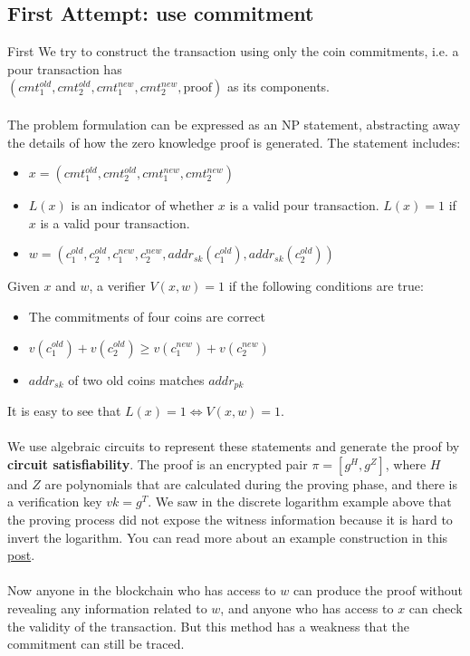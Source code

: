 \subsection{First Attempt: use commitment}
First We try to construct the transaction using only the coin commitments, i.e. a pour transaction has \\
$(cmt_1^{old} , cmt_2^{old}, cmt_1^{new}, cmt_2^{new} , \text{proof})$ as its components.\\\\
The problem formulation can be expressed as an NP statement, abstracting away the details of how the zero knowledge proof is generated. The statement includes:
\begin{itemize}
	\item $ x = (cmt_1^{old} , cmt_2^{old}, cmt_1^{new}, cmt_2^{new}) $
	\item $L(x)$ is an indicator of whether $x$ is a valid pour transaction. $L(x) = 1$ if $x$ is a valid pour transaction.
	\item $w = \left(c_1^{old}, c_2^{old}, c_1^{new}, c_2^{new}, addr_{sk}(c_1^{old}), addr_{sk}(c_2^{old})\right)$
\end{itemize}
Given $x$ and $w$, a verifier $V(x,w) = 1$ if the following conditions are true:
\begin{itemize}
	\item The commitments of four coins are correct
	\item $v(c_1^{old} )+v(c_2^{old} ) \ge v(c_1^{new} )+v(c_2^{new})$
	\item $addr_{sk}$ of two old coins matches $addr_{pk}$ 
\end{itemize}
It is easy to see that $L(x) = 1 \Leftrightarrow V(x,w) = 1$.\\\\
We use algebraic circuits to represent these statements and generate the proof by \textbf{circuit satisfiability}. The proof is an encrypted pair $\pi = [g^H, g^Z]$, where $H$ and $Z$ are polynomials that are calculated during the proving phase, and there is a verification key $vk = g^T$. We saw in the discrete logarithm example above that the proving process did not expose the witness information because it is hard to invert the logarithm. You can read more about an example construction in this \href{https://medium.com/@VitalikButerin/quadratic-arithmetic-programs-from-zero-to-hero-f6d558cea649}{post}.\\\\
Now anyone in the blockchain who has access to $w$ can produce the proof without revealing any information related to $w$, and anyone who has access to $x$ can check the validity of the transaction. But this method has a weakness that the commitment can still be traced.
